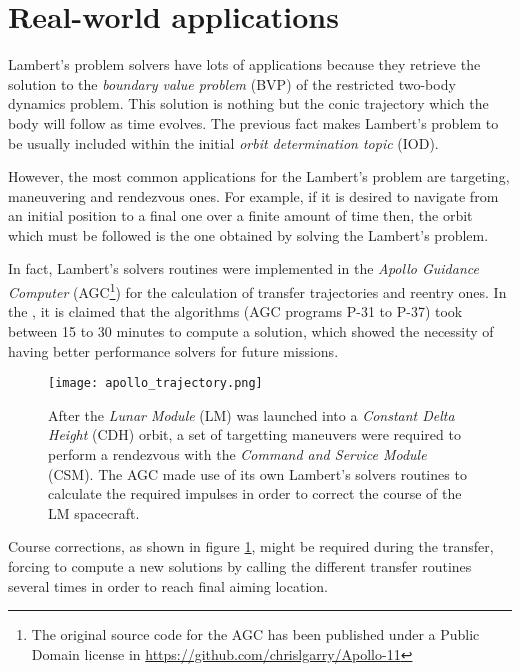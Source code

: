 \newpage
\section{Real-world applications}
\label{sec:applications}

Lambert's problem solvers have lots of applications because they retrieve the
solution to the \textit{boundary value problem} (BVP) of the restricted two-body
dynamics problem.  This solution is nothing but the conic trajectory which the
body will follow as time evolves. The previous fact makes Lambert's problem to be
usually included within the initial \textit{orbit determination topic} (IOD).

However, the most common applications for the Lambert's problem are targeting,
maneuvering and rendezvous ones. For example, if it is desired to navigate from
an initial position to a final one over a finite amount of time then, the orbit
which must be followed is the one obtained by solving the Lambert's problem.

In fact, Lambert's solvers routines were implemented in the \textit{Apollo
  Guidance Computer} (AGC\footnote{The original source code for the AGC has been
  published under a Public Domain license in
  \href{https://github.com/chrislgarry/Apollo-11}{https://github.com/chrislgarry/Apollo-11}}) for the calculation of transfer
trajectories and reentry ones. In the , it is claimed that
the algorithms (AGC programs P-31 to P-37) took between 15 to 30 minutes to
compute a solution, which showed the necessity of having better performance
solvers for future missions.

\vspace{0.5cm}
\begin{figure}[h]
  \centering
  \texttt{[image: apollo\_trajectory.png]}
  \caption[Apollo-11 taking advantage of Lambert's based maneuver]{After the \textit{Lunar Module} (LM) was launched into a
    \textit{Constant Delta Height} (CDH) orbit, a set of targetting
    maneuvers were required to perform a rendezvous with the \textit{Command
      and Service Module} (CSM). The AGC made use of its own Lambert's
    solvers routines to calculate the required impulses in order to correct
    the course of the LM spacecraft.}
  \label{fig:apollo_trajectory}
\end{figure}

Course corrections, as shown in figure \ref{fig:apollo_trajectory}, might be
required during the transfer, forcing to compute a new solutions by calling the
different transfer routines several times in order to reach final aiming
location.

